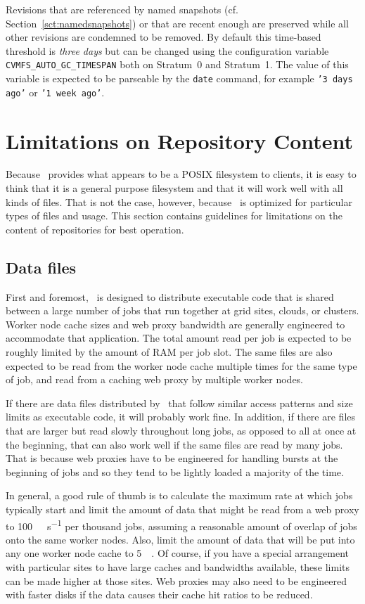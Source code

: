 Revisions that are referenced by named snapshots (cf. Section~\ref{sct:namedsnapshots}) or that are recent enough are preserved while all other revisions are condemned to be removed.
By default this time-based threshold is \emph{three days} but can be changed using the configuration variable \texttt{CVMFS\_AUTO\_GC\_TIMESPAN} both on Stratum~0 and Stratum~1.
The value of this variable is expected to be parseable by the \texttt{date} command, for example \texttt{'3 days ago'} or \texttt{'1 week ago'}.

\section{Limitations on Repository Content}
Because \cvmfs\ provides what appears to be a POSIX filesystem to clients, it is easy to think that it is a general purpose filesystem and that it will work well with all kinds of files.
That is not the case, however, because \cvmfs\ is optimized for particular types of files and usage.
This section contains guidelines for limitations on the content of repositories for best operation.

\subsection{Data files}
First and foremost, \cvmfs\ is designed to distribute executable code that is shared between a large number of jobs that run together at grid sites, clouds, or clusters.
Worker node cache sizes and web proxy bandwidth are generally engineered to accommodate that application.
The total amount read per job is expected to be roughly limited by the amount of RAM per job slot.
The same files are also expected to be read from the worker node cache multiple times for the same type of job, and read from a caching web proxy by multiple worker nodes.

If there are data files distributed by \cvmfs\ that follow similar access patterns and size limits as executable code, it will probably work fine.
In addition, if there are files that are larger but read slowly throughout long jobs, as opposed to all at once at the beginning, that can also work well if the same files are read by many jobs.
That is because web proxies have to be engineered for handling bursts at the beginning of jobs and so they tend to be lightly loaded a majority of the time.

In general, a good rule of thumb is to calculate the maximum rate at which jobs typically start and limit the amount of data that might be read from a web proxy to \SI{100}{\mega\byte\per\second} per thousand jobs, assuming a reasonable amount of overlap of jobs onto the same worker nodes.
Also, limit the amount of data that will be put into any one worker node cache to \SI{5}{\giga\byte}.
Of course, if you have a special arrangement with particular sites to have large caches and bandwidths available, these limits can be made higher at those sites.
Web proxies may also need to be engineered with faster disks if the data causes their cache hit ratios to be reduced.

